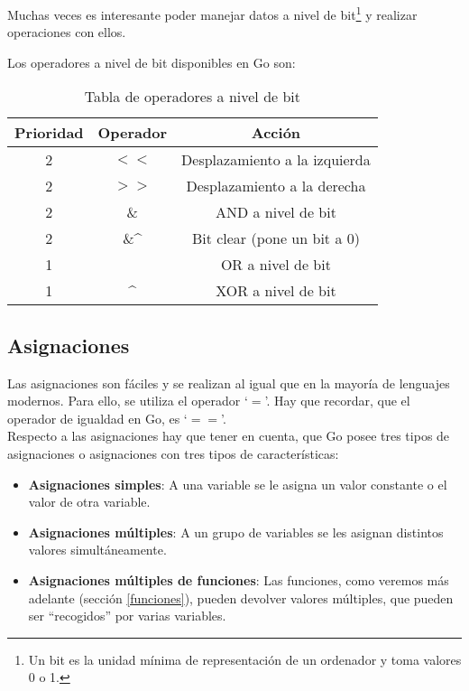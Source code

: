 	Muchas veces es interesante poder manejar datos a nivel de bit\footnote{Un
	bit es la unidad mínima de representación de un ordenador y toma valores
	0 o 1.}	y realizar operaciones con ellos.

	Los operadores a nivel de bit disponibles en Go son:

	\begin{table}[htb]
		\begin{center}
			\begin{tabular}{ccc}
				\textbf{Prioridad} & \textbf{Operador} & \textbf{Acción}\\
				\hline
				2 & $<<$ & Desplazamiento a la izquierda\\
				2 & $>>$ & Desplazamiento a la derecha\\
				2 & \& & AND a nivel de bit\\
				2 & \&\textasciicircum & Bit clear (pone un bit a 0)\\
				1 & \textbar & OR a nivel de bit\\
				1 & \textasciicircum & XOR a nivel de bit\\
				\hline
			\end{tabular}
		\end{center}
		\caption{Tabla de operadores a nivel de bit}
	\end{table}

	\subsection{Asignaciones}

	Las asignaciones son fáciles y se realizan al igual que en la mayoría de
	lenguajes modernos. Para ello, se utiliza el operador `$=$'. Hay que
	recordar, que el operador de igualdad en Go, es `$==$'.\\

	Respecto a las asignaciones hay que tener en cuenta, que Go posee tres tipos
	de asignaciones o asignaciones con tres tipos de características:

	\begin{itemize}
		\item \textbf{Asignaciones simples}: A una variable se le asigna un
		valor constante o el valor de otra variable.
		\item \textbf{Asignaciones múltiples}: A un grupo de variables se les
		asignan	distintos valores simultáneamente.
		\item \textbf{Asignaciones múltiples de	funciones}: Las funciones, como
		veremos más adelante (sección \ref{funciones}), pueden devolver	valores
		múltiples, que pueden ser ``recogidos'' por varias variables.
	\end{itemize}

